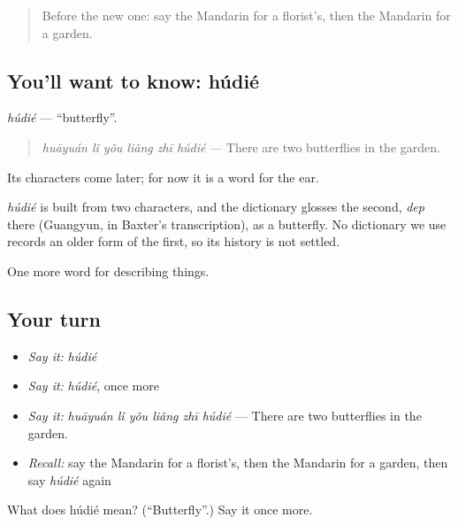 \label{lesson:ZH-C224-hudie}



\begin{quote}
Before the new one: say the Mandarin for a florist's, then the Mandarin for a garden.
\end{quote}

\subsection*{You'll want to know: húdié}
\emph{húdié} — \textquotedblleft{}butterfly\textquotedblright{}.

\begin{quote}
\emph{huāyuán lǐ yǒu liǎng zhī húdié} — There are two butterflies in the garden.
\end{quote}

Its characters come later; for now it is a word for the ear.

\begin{cousinweb}
\emph{húdié} is built from two characters, and the dictionary glosses the second, \emph{dep} there (Guangyun, in Baxter's transcription), as a butterfly. No dictionary we use records an older form of the first, so its history is not settled.
\end{cousinweb}

\begin{grammarlens}[title={What you've built}]
One more word for describing things.
\end{grammarlens}

\subsection*{Your turn}
\begin{itemize}
\raggedright
  \item \emph{Say it:} \emph{húdié}
  \item \emph{Say it:} \emph{húdié}, once more
  \item \emph{Say it:} \emph{huāyuán lǐ yǒu liǎng zhī húdié} — There are two butterflies in the garden.
  \item \emph{Recall:} say the Mandarin for a florist's, then the Mandarin for a garden, then say \emph{húdié} again
\end{itemize}

\begin{tcolorbox}[breakable,colback=teal!4,colframe=teal!35!black,title={Before you move on}]
What does húdié mean? (\textquotedblleft{}Butterfly\textquotedblright{}.) Say it once more.
\end{tcolorbox}
